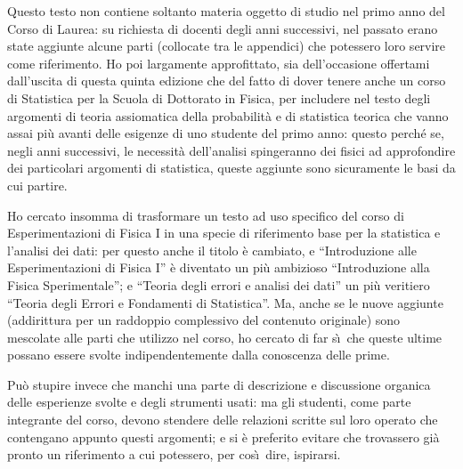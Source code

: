 {  Questo testo non contiene soltanto materia oggetto di
  studio nel primo anno del Corso di Laurea: su richiesta di
  docenti degli anni successivi, nel passato erano state
  aggiunte alcune parti (collocate tra le appendici) che
  potessero loro servire come riferimento.  Ho poi
  largamente approfittato, sia dell'occasione offertami
  dall'uscita di questa quinta edizione che del fatto di
  dover tenere anche un corso di Statistica per la Scuola di
  Dottorato in Fisica, per includere nel testo degli
  argomenti di teoria assiomatica della probabilit\`a e di
  statistica teorica che vanno assai pi\`u avanti delle
  esigenze di uno studente del primo anno: questo perch\'e
  se, negli anni successivi, le necessit\`a dell'analisi
  spingeranno dei fisici ad approfondire dei particolari
  argomenti di statistica, queste aggiunte sono sicuramente
  le basi da cui partire.

  Ho cercato insomma di trasformare un testo ad uso
  specifico del corso di Esperimentazioni di Fisica I in una
  specie di riferimento base per la statistica e l'analisi
  dei dati: per questo anche il titolo \`e cambiato, e
  ``Introduzione alle Esperimentazioni di Fisica I'' \`e
  diventato un pi\`u ambizioso ``Introduzione alla Fisica
  Sperimentale''; e ``Teoria degli errori e analisi dei
  dati'' un pi\`u veritiero ``Teoria degli Errori e
  Fondamenti di Statistica''.  Ma, anche se le nuove
  aggiunte (addirittura per un raddoppio complessivo del
  contenuto originale) sono mescolate alle parti che
  utilizzo nel corso, ho cercato di far s\`\i\ che queste
  ultime possano essere svolte indipendentemente dalla
  conoscenza delle prime.

  Pu\`o stupire invece che manchi una parte di descrizione e
  discussione organica delle esperienze svolte e degli
  strumenti usati: ma gli studenti, come parte integrante
  del corso, devono stendere delle relazioni scritte sul
  loro operato che contengano appunto questi argomenti; e si
  \`e preferito evitare che trovassero gi\`a pronto un
  riferimento a cui potessero, per cos\`\i\ dire, ispirarsi.

  \vfill{}
}

